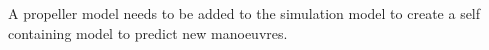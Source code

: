 %




A propeller model needs to be added to the simulation model to create a self containing model to predict new manoeuvres. 

